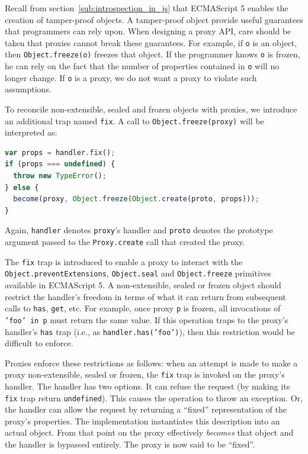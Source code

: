 \documentclass{sig-alternate}
\begin{document}
Recall from section~\ref{sub:introspection_in_js} that ECMAScript 5 enables the creation of tamper-proof objects. A tamper-proof object provide useful guarantees that programmers can rely upon. When designing a proxy API, care should be taken that proxies cannot break these guarantees. For example, if \texttt{o} is an object, then \texttt{Object.freeze(o)} freezes that object. If the programmer knows \texttt{o} is frozen, he can rely on the fact that the number of properties contained in \texttt{o} will no longer change. If \texttt{o} is a proxy, we do not want a proxy to violate such assumptions.

To reconcile non-extensible, sealed and frozen objects with proxies, we introduce an additional trap named \texttt{fix}. A call to \texttt{Object.freeze(proxy)} will be interpreted as:

\begin{lstlisting}[language=javascript]
var props = handler.fix();
if (props === undefined) {
  throw new TypeError();
} else {
  become(proxy, Object.freeze(Object.create(proto, props)));
}
\end{lstlisting}

Again, \texttt{handler} denotes \texttt{proxy}'s handler and \texttt{proto} denotes the prototype argument passed to the \texttt{Proxy.create} call that created the proxy.

The \texttt{fix} trap is introduced to enable a proxy to interact with the \texttt{Object.preventExtensions}, \texttt{Object.seal} and \texttt{Object.freeze} primitives available in ECMAScript 5. A non-extensible, sealed or frozen object should restrict the handler's freedom in terms of what it can return from subsequent calls to \texttt{has}, \texttt{get}, etc. For example, once proxy \texttt{p} is frozen, all invocations of \texttt{'foo' in p} must return the same value. If this operation traps to the proxy's handler's \texttt{has} trap (i.e., as \texttt{handler.has('foo')}), then this restriction would be difficult to enforce.


Proxies enforce these restrictions as follows: when an attempt is made to make a proxy non-extensible, sealed or frozen, the \texttt{fix} trap is invoked on the proxy's handler. The handler has two options. It can refuse the request (by making its \texttt{fix} trap return \texttt{undefined}). This causes the operation to throw an exception. Or, the handler can allow the request by returning a ``fixed'' representation of the proxy's properties. The implementation instantiates this description into an actual object. From that point on the proxy effectively \emph{becomes} that object and the handler is bypassed entirely. The proxy is now said to be ``fixed''.
\end{document}
